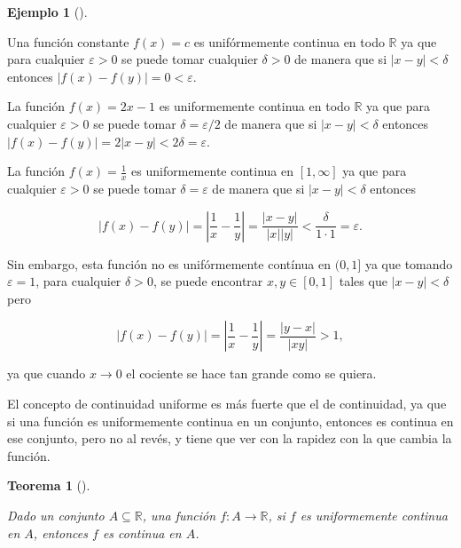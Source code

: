 \documentclass[
  a4paper,
]{scrreport}
\theoremstyle{plain}
\newtheorem{theorem}{Teorema}[chapter]
\theoremstyle{definition}
\theoremstyle{plain}
\theoremstyle{plain}
\theoremstyle{definition}
\newtheorem{example}{Ejemplo}[chapter]
\theoremstyle{definition}
\theoremstyle{remark}
\begin{document}
\begin{example}[]\protect\hypertarget{exm-funcion-uniformemente-continua}{}\label{exm-funcion-uniformemente-continua}

Una función constante \(f(x)=c\) es unifórmemente continua en todo
\(\mathbb{R}\) ya que para cualquier \(\varepsilon>0\) se puede tomar
cualquier \(\delta>0\) de manera que si \(|x-y|<\delta\) entonces
\(|f(x)-f(y)|=0<\varepsilon\).

La función \(f(x)=2x-1\) es uniformemente continua en todo
\(\mathbb{R}\) ya que para cualquier \(\varepsilon>0\) se puede tomar
\(\delta=\varepsilon/2\) de manera que si \(|x-y|<\delta\) entonces
\(|f(x)-f(y)|=2|x-y|<2\delta=\varepsilon\).

La función \(f(x)=\frac{1}{x}\) es uniformemente continua en
\([1,\infty]\) ya que para cualquier \(\varepsilon>0\) se puede tomar
\(\delta=\varepsilon\) de manera que si \(|x-y|<\delta\) entonces

\[
|f(x)-f(y)|=\left|\frac{1}{x}-\frac{1}{y}\right|=\frac{|x-y|}{|x||y|}<\frac{\delta}{1\cdot 1}=\varepsilon. 
\]

Sin embargo, esta función no es unifórmemente contínua en \((0,1]\) ya
que tomando \(\varepsilon=1\), para cualquier \(\delta>0\), se puede
encontrar \(x,y\in[0,1]\) tales que \(|x-y|<\delta\) pero

\[
|f(x)-f(y)|=\left|\frac{1}{x}-\frac{1}{y}\right|=\frac{|y-x|}{|xy|}>1,
\]

ya que cuando \(x\to 0\) el cociente se hace tan grande como se quiera.

\end{example}

El concepto de continuidad uniforme es más fuerte que el de continuidad,
ya que si una función es uniformemente continua en un conjunto, entonces
es continua en ese conjunto, pero no al revés, y tiene que ver con la
rapidez con la que cambia la función.

\begin{theorem}[]\protect\hypertarget{thm-funcion-uniformemente-continua}{}\label{thm-funcion-uniformemente-continua}

Dado un conjunto \(A\subseteq \mathbb{R}\), una función
\(f:A\to \mathbb{R}\), si \(f\) es uniformemente continua en \(A\),
entonces \(f\) es continua en \(A\).

\end{theorem}
\end{document}
